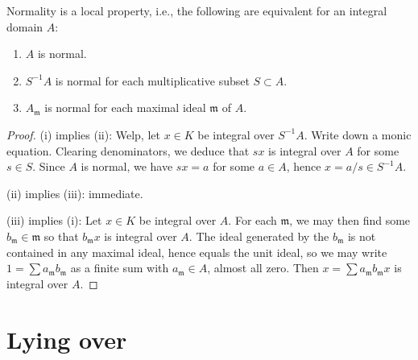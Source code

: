 \documentclass[10pt]{article}
\begin{document}
\begin{lemma}
  Normality is a local property,
  i.e., the following are equivalent
  for an integral domain $A$:
  \begin{enumerate}
  \item $A$ is normal.
  \item $S^{-1} A$ is normal for each multiplicative subset $S \subset A$.
  \item $A_\mathfrak{m}$ is normal for each maximal ideal $\mathfrak{m}$ of $A$.
  \end{enumerate}
\end{lemma}
\begin{proof}
  (i) implies (ii):
  Welp, let $x \in K$ be integral over $S^{-1} A$.
  Write down a monic equation.
  Clearing denominators, we deduce that $s x$ is integral over
  $A$ for some
  $s \in S$.
  Since $A$ is normal,
  we have $s x = a$ for some $a \in A$,
  hence $x = a/s \in S^{-1} A$.

  (ii) implies (iii): immediate.

  (iii) implies (i): Let $x \in K$ be integral over $A$.  For
  each $\mathfrak{m}$, we may then find some
  $b_\mathfrak{m} \in \mathfrak{m}$ so that $b_\mathfrak{m} x$
  is integral over $A$.  The ideal generated by the
  $b_\mathfrak{m}$ is not contained in any maximal ideal, hence
  equals the unit ideal, so we may write
  $1 = \sum a_\mathfrak{m} b_\mathfrak{m}$ as a finite sum with
  $a_\mathfrak{m} \in A$, almost all zero.  Then
  $x = \sum a_\mathfrak{m} b_\mathfrak{m} x$ is integral over
  $A$.
\end{proof}

\section{Lying over}
\label{sec:org5a401b5}
\end{document}
